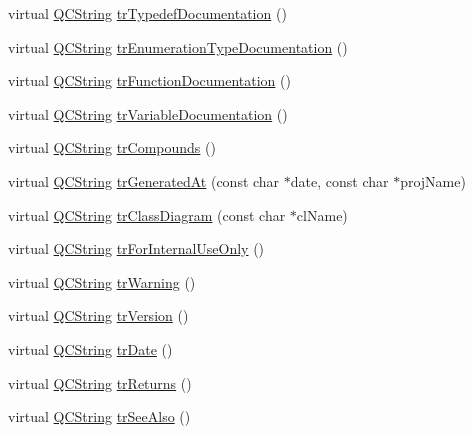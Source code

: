 \begin{DoxyCompactItemize}
\item 
virtual \hyperlink{class_q_c_string}{Q\-C\-String} \hyperlink{class_translator_catalan_a284d8febafa52e730c3f929a1f17f166}{tr\-Typedef\-Documentation} ()
\item 
virtual \hyperlink{class_q_c_string}{Q\-C\-String} \hyperlink{class_translator_catalan_a03114d3cc3330b921600693ad71adc2f}{tr\-Enumeration\-Type\-Documentation} ()
\item 
virtual \hyperlink{class_q_c_string}{Q\-C\-String} \hyperlink{class_translator_catalan_a8dc8036d97f4f5406392646044d5af7e}{tr\-Function\-Documentation} ()
\item 
virtual \hyperlink{class_q_c_string}{Q\-C\-String} \hyperlink{class_translator_catalan_aa3ed4d30194d5ad2ae633df2d91e4bcd}{tr\-Variable\-Documentation} ()
\item 
virtual \hyperlink{class_q_c_string}{Q\-C\-String} \hyperlink{class_translator_catalan_a603472da4b3038d38d1f322fa07c580e}{tr\-Compounds} ()
\item 
virtual \hyperlink{class_q_c_string}{Q\-C\-String} \hyperlink{class_translator_catalan_a4fdf6d63541eaaa48cd09fd9ffdf2bec}{tr\-Generated\-At} (const char $\ast$date, const char $\ast$proj\-Name)
\item 
virtual \hyperlink{class_q_c_string}{Q\-C\-String} \hyperlink{class_translator_catalan_a5650582c9e4157837fa0a32b75772947}{tr\-Class\-Diagram} (const char $\ast$cl\-Name)
\item 
virtual \hyperlink{class_q_c_string}{Q\-C\-String} \hyperlink{class_translator_catalan_afd682dc33a99dbe52d3d56cace1a4378}{tr\-For\-Internal\-Use\-Only} ()
\item 
virtual \hyperlink{class_q_c_string}{Q\-C\-String} \hyperlink{class_translator_catalan_a30dfe9a37c224d94a44acf885cfec685}{tr\-Warning} ()
\item 
virtual \hyperlink{class_q_c_string}{Q\-C\-String} \hyperlink{class_translator_catalan_a4c159562e29fe27461d720f6b85c6f7e}{tr\-Version} ()
\item 
virtual \hyperlink{class_q_c_string}{Q\-C\-String} \hyperlink{class_translator_catalan_a715c7be3c49c9d5aba58e4b64cc6c00b}{tr\-Date} ()
\item 
virtual \hyperlink{class_q_c_string}{Q\-C\-String} \hyperlink{class_translator_catalan_ab5d8a97c3f20037cac764de958bd65e7}{tr\-Returns} ()
\item 
virtual \hyperlink{class_q_c_string}{Q\-C\-String} \hyperlink{class_translator_catalan_af0d165ede50aabbbdc9db316e370251f}{tr\-See\-Also} ()
\item 

\end{DoxyCompactItemize}
